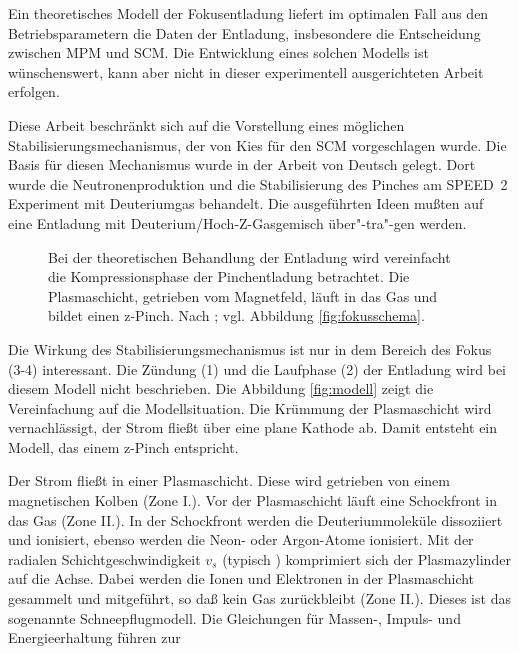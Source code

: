 %
%
\label{sec:mechanismus}
%
Ein theoretisches Modell der Fokusentladung liefert im optimalen Fall
aus den Betriebsparametern die Daten der Entladung, insbesondere die
Entscheidung zwischen MPM und SCM. Die Entwicklung eines solchen
Modells ist wünschenswert, kann aber nicht in dieser experimentell
ausgerichteten Arbeit erfolgen.
\par
Diese Arbeit beschränkt sich auf die Vorstellung eines möglichen
Stabilisierungsmechanismus, der von Kies \cite{kies:99} für den
SCM vorgeschlagen wurde. Die Basis für diesen Mechanismus wurde in
der Arbeit von Deutsch \cite{deutsch:87} gelegt. Dort wurde die
Neutronenproduktion und die Stabilisierung des Pinches am SPEED~2
Experiment mit Deuteriumgas behandelt. Die ausgeführten Ideen
mußten auf eine Entladung mit Deuterium/Hoch-Z-Gasgemisch
über"-tra"-gen werden.
%
\par
\begin{figure}[H]
  \center
  \caption{Bei der theoretischen Behandlung der Entladung wird vereinfacht
    die Kompressionsphase der Pinchentladung betrachtet. Die
    Plasmaschicht, getrieben vom Magnetfeld, läuft in das Gas und bildet
    einen z-Pinch. Nach \cite{deutsch:87}; vgl. Abbildung \vref{fig:fokusschema}.}
  \label{fig:modell}
\end{figure}
%
\par
Die Wirkung des Stabilisierungsmechanismus ist nur in dem Bereich des
Fokus (3-4) interessant. Die Zündung (1) und die Laufphase (2) der
Entladung wird bei diesem Modell nicht beschrieben. Die Abbildung
\vref{fig:modell} zeigt die Vereinfachung auf die Modellsituation. Die
Krümmung der Plasmaschicht wird vernachlässigt, der Strom fließt über
eine plane Kathode ab. Damit entsteht ein Modell, das einem z-Pinch
entspricht.
\par
Der Strom fließt in einer Plasmaschicht. Diese wird getrieben von einem
magnetischen Kolben (Zone I.). Vor der Plasmaschicht läuft eine
Schockfront in das Gas (Zone II.). In der Schockfront werden die
Deuteriummoleküle dissoziiert und ionisiert, ebenso werden die Neon-
oder Argon-Atome ionisiert. Mit der radialen Schichtgeschwindigkeit
$v_s$ (typisch ) komprimiert sich der Plasmazylinder
auf die Achse. Dabei werden die Ionen und Elektronen in der
Plasmaschicht gesammelt und mitgeführt, so daß kein Gas zurückbleibt
(Zone II.). Dieses ist das sogenannte Schneepflugmodell. Die
Gleichungen für Massen-, Impuls- und Energieerhaltung führen zur
